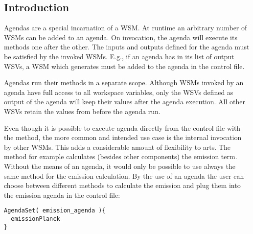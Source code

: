 \subsection{Introduction}
Agendas are a special incarnation of a WSM. At runtime an arbitrary
number of WSMs can be added to an agenda. On invocation, the agenda
will execute its methods one after the other. The inputs and outputs
defined for the agenda must be satisfied by the invoked WSMs. E.g., if
an agenda has  in its list of output WSVs, a WSM
which generates  must be added to the agenda in the
control file.

Agendas run their methods in a separate scope. Although WSMs invoked by
an agenda have full access to all workspace variables, only the WSVs
defined as output of the agenda will keep their values after the agenda
execution. All other WSVs retain the values from before the agenda
run.

Even though it is possible to execute agenda directly from the control
file with the  method, the more common and
intended use case is the internal invocation by other WSMs. This adds a
considerable amount of flexibility to arts. The  method for
example calculates (besides other components) the emission term. Without
the means of an agenda, it would only be possible to use always the same
method for the emission calculation. By the use of an agenda the user
can choose between different methods to calculate the emission and plug
them into the emission agenda in the control file:

{\small
\begin{verbatim}
AgendaSet( emission_agenda ){
  emissionPlanck
}
\end{verbatim}
}





